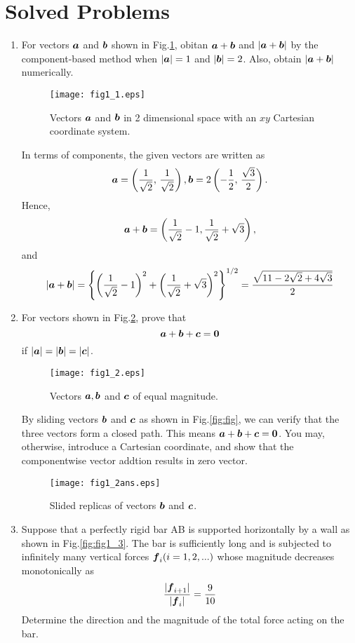 \documentclass[10pt,a4j]{article}
\begin{document}
\section{Solved Problems}
\begin{enumerate}
\item
	For vectors $\mbox{\boldmath $a$}$ and $\mbox{\boldmath $b$}$ shown in Fig.\ref{fig:fig1_1}, 
	obitan $\mbox{\boldmath $a$}+\mbox{\boldmath $b$}$ and $\left| \mbox{\boldmath $a$}+\mbox{\boldmath $b$} \right|$ 
	by the component-based method when $|\mbox{\boldmath $a$}|=1$ and $|\mbox{\boldmath $b$}|=2$.
	Also, obtain $|\mbox{\boldmath $a$}+\mbox{\boldmath $b$}|$ numerically.
	\begin{figure}
		\begin{center}
		\texttt{[image: fig1\_1.eps]} 
		\end{center}
		\caption{Vectors $\mbox{\boldmath $a$}$ and $\mbox{\boldmath $b$}$ in 2 dimensional space with an $xy$ Cartesian coordinate system.}
		\label{fig:fig1_1}
	\end{figure}

	{\small
	In terms of components, the given vectors are written as 
	\[
		\mbox{\boldmath $a$}= \left( \frac{1}{\sqrt{2}}, \, \frac{1}{\sqrt{2}}\right), 
		\mbox{\boldmath $b$}=2 \left( -\frac{1}{2}, \, \frac{\sqrt{3}}{2}\right).
	\]
	Hence,
	\[
		\mbox{\boldmath $a$}+\mbox{\boldmath $b$}=\left( \frac{1}{\sqrt{2}}-1, \frac{1}{\sqrt{2}}+\sqrt{3}\right),
	\]
	and 
	\[
		| \mbox{\boldmath $a$}+\mbox{\boldmath $b$}| = 
		\left\{
		\left( \frac{1}{\sqrt{2}}-1\right)^2 +
		\left( \frac{1}{\sqrt{2}}+\sqrt{3}\right)^2
		\right\}^{1/2}
		=
		\frac{\sqrt{11-2\sqrt{2}+4\sqrt{3}}}{2}
	\]
	}
\item
	For vectors shown in Fig.\ref{fig:fig1_2}, prove that 
	\[
		\mbox{\boldmath $a$}+\mbox{\boldmath $b$}+\mbox{\boldmath $c$}=\mbox{\boldmath $0$}
	\]
	if $|\mbox{\boldmath $a$}|=|\mbox{\boldmath $b$}|=|\mbox{\boldmath $c$}|$.\\
	\begin{figure}[h]
	\begin{center}
		\texttt{[image: fig1\_2.eps]} 
		\end{center}
		\caption{Vectors $\mbox{\boldmath $a$}, \mbox{\boldmath $b$}$ and $\mbox{\boldmath $c$}$ of equal magnitude.} 
		\label{fig:fig1_2}
	\end{figure}

	{\small
		By sliding vectors $\mbox{\boldmath $b$}$ and $\mbox{\boldmath $c$}$ as shown in Fig.\ref{fig:fig}, 
		we can verify that the three vectors form a closed path. 
		This means $\mbox{\boldmath $a$}+\mbox{\boldmath $b$}+\mbox{\boldmath $c$}=\mbox{\boldmath $0$}$. 
		You may, otherwise, introduce a Cartesian coordinate, and show that the componentwise vector addtion results in zero vector. 
	}
	\begin{figure}[h]
		\begin{center}
		\texttt{[image: fig1\_2ans.eps]} 
		\end{center}
		\caption{Slided replicas of vectors $\mbox{\boldmath $b$}$ and $\mbox{\boldmath $c$}$.} 
		\label{fig:fig1_2ans}
	\end{figure}
\item
	Suppose that a perfectly rigid bar AB is supported horizontally by a wall
	as shown in Fig.\ref{fig:fig1_3}. The bar is sufficiently long and is 
	subjected to infinitely many vertical forces $\mbox{\boldmath $f$}_i (i=1,2,...)$ 
	whose magnitude decreases monotonically as 
	\[
	 \frac{ |\mbox{\boldmath $f$}_{i+1}| }{ |\mbox{\boldmath $f$}_i| } =\frac{9}{10} 
	\]
	Determine the direction and the magnitude of the total force acting on the bar.\\


\end{enumerate}
\end{document}
